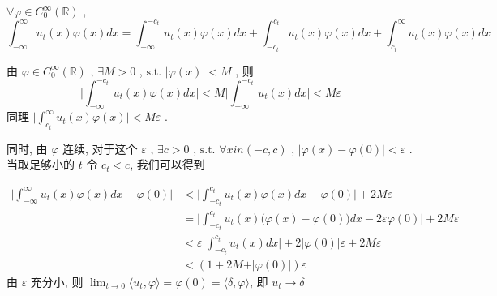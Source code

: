 \documentclass[a4paper, UTF8]{ctexart}				%
\numberwithin{equation}{section}				%
\begin{document}
        $\forall \varphi \in C_0^{\infty}(\mathbb{R})$ ,
        \[
            \int^{\infty}_{-\infty} u_t(x) \varphi(x) dx
             = \int^{-c_t}_{-\infty} u_t(x) \varphi(x) dx
             + \int^{c_t}_{-c_t} u_t(x) \varphi(x) dx
             + \int^{\infty}_{c_t} u_t(x) \varphi(x) dx
        \]

        由 $\varphi \in C_0^{\infty}(\mathbb{R})$ , $\exists M > 0$ , $\text{s.t. }\vert{\varphi(x)}\vert < M$ , 则
        \[
            \Biggl\vert{\int^{-c_t}_{-\infty} u_t(x) \varphi(x) dx}\Biggl\vert
            < M \Biggl\vert{\int^{-c_t}_{-\infty} u_t(x) dx}\Biggl\vert < M \varepsilon
        \]
        同理 $\vert{\int^{\infty}_{c_t} u_t(x) \varphi(x)}\vert < M \varepsilon$ . 
        
        同时, 由 $\varphi$ 连续, 对于这个 $\varepsilon$ , $\exists c > 0$ , $\text{s.t. } \forall x in (-c, c)$ , $\vert{\varphi(x) - \varphi(0)}\vert < \varepsilon$ . 当取足够小的 $t$ 令 $c_t < c$, 我们可以得到
        
        \begin{equation*}
            \begin{split}
                \Biggl\vert{\int^{\infty}_{-\infty} u_t(x) \varphi(x) dx - \varphi(0)}\Biggl\vert
                & < \Biggl\vert{\int^{c_t}_{-c_t} u_t(x) \varphi(x) dx - \varphi(0)}\Biggl\vert + 2M \varepsilon\\
                & = \Biggl\vert{\int^{c_t}_{-c_t} u_t(x) \big(\varphi(x) - \varphi(0)\big) dx - 2 \varepsilon \varphi(0)}\Biggl\vert + 2M \varepsilon\\
                & < \varepsilon \Biggl\vert{\int^{c_t}_{-c_t} u_t(x) dx}\Biggl\vert + 2 \vert{\varphi(0)}\vert \varepsilon + 2 M \varepsilon\\
                & < (1 + 2M + \vert{\varphi(0)}\vert) \varepsilon
            \end{split}
        \end{equation*}
        由 $\varepsilon$ 充分小, 则 $\lim_{t \rightarrow 0} \langle{u_t},{\varphi}\rangle = \varphi(0) = \langle{\delta},{\varphi}\rangle$, 即 $u_t \rightarrow \delta$
\end{document}
